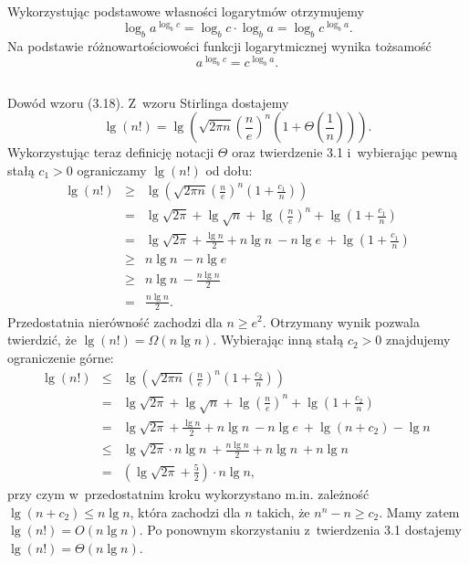 \subsection{} %
Wykorzystując podstawowe własności logarytmów otrzymujemy
\[
	\log_ba^{\log_bc} = \log_bc\cdot\log_ba = \log_bc^{\log_ba}.
\]
Na podstawie różnowartościowości funkcji logarytmicznej wynika tożsamość
\[
	a^{\log_bc}=c^{\log_ba}.
\]

\subsection{} %
Dowód wzoru (3.18). Z~wzoru Stirlinga dostajemy
\[
	\lg(n!) = \lg\left(\sqrt{2\pi n}\left(\frac{n}{e}\right)^n\left(1+\Theta\left(\frac{1}{n}\right)\right)\right).
\]
Wykorzystując teraz definicję notacji $\Theta$ oraz twierdzenie 3.1 i~wybierając pewną stałą $c_1>0$ ograniczamy $\lg(n!)$ od dołu:
\begin{eqnarray*}
	\lg(n!) &\ge& \lg\left(\sqrt{2\pi n}\left(\frac{n}{e}\right)^n\left(1+\frac{c_1}{n}\right)\right) \\
	&=& \lg\sqrt{2\pi} + \lg\sqrt{n} + \lg\left(\frac{n}{e}\right)^n + \lg\left(1+\frac{c_1}{n}\right) \\
	&=& \lg\sqrt{2\pi} + \frac{\lg n}{2} + n\lg n~- n\lg e~+ \lg\left(1+\frac{c_1}{n}\right) \\
	&\ge& n\lg n~- n\lg e~\\
	&\ge& n\lg n~- \frac{n\lg n}{2} \\
	&=& \frac{n\lg n}{2}.
\end{eqnarray*}
Przedostatnia nierówność zachodzi dla $n\ge e^2$. Otrzymany wynik pozwala twierdzić, że $\lg(n!)=\Omega(n\lg n)$. Wybierając inną stałą $c_2>0$ znajdujemy ograniczenie górne:
\begin{eqnarray*}
	\lg(n!) &\le& \lg\left(\sqrt{2\pi n}\left(\frac{n}{e}\right)^n\left(1+\frac{c_2}{n}\right)\right) \\
	&=& \lg\sqrt{2\pi} + \lg\sqrt{n} + \lg\left(\frac{n}{e}\right)^n + \lg\left(1+\frac{c_2}{n}\right) \\
	&=& \lg\sqrt{2\pi} + \frac{\lg n}{2} + n\lg n~- n\lg e~+ \lg (n+c_2) - \lg n~\\
	&\le& \lg\sqrt{2\pi}\cdot n\lg n~+ \frac{n\lg n}{2} + n\lg n~+ n\lg n~\\
	&=& \left(\lg\sqrt{2\pi}+\frac{5}{2}\right)\cdot n\lg n,
\end{eqnarray*}
przy czym w~przedostatnim kroku wykorzystano m.in. zależność $\lg(n+c_2)\le n\lg n$, która zachodzi dla $n$ takich, że $n^n-n\ge c_2$. Mamy zatem $\lg(n!)=O(n\lg n)$. Po ponownym skorzystaniu z~twierdzenia 3.1 dostajemy $\lg(n!)=\Theta(n\lg n)$.

